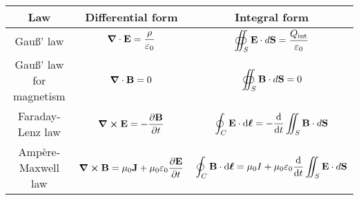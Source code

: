 \documentclass[../../../main.tex]{subfiles}
\begin{document}
\begin{table}[ht]
  \centering
  \renewcommand{\arraystretch}{2.5}
  \begin{tabular}{|c|c|c|}
    \hline
    \bfseries Law             & \bfseries Differential form                                                                                                                                & \bfseries Integral form                                                                                                                                      \\
    \hline
    Gau\ss' law               & $\displaystyle \boldsymbol{\mathrm{\grad}}\cdot\boldsymbol{\mathrm{E}}=\frac{\rho}{\varepsilon_0}$                                                                   & $\displaystyle \oiint_S\boldsymbol{\mathrm{E}}\cdot d\boldsymbol{\mathrm{S}}=\frac{Q_{\text{int}}}{\varepsilon_0}$                                                     \\
    \hline
    Gau\ss' law for magnetism & $\displaystyle \boldsymbol{\mathrm{\grad}}\cdot\boldsymbol{\mathrm{B}}=0$                                                                                            & $\displaystyle \oiint_S\boldsymbol{\mathrm{B}}\cdot d\boldsymbol{\mathrm{S}}=0$                                                                                        \\
    \hline
    Faraday-Lenz law          & $\displaystyle \vectorfunction{\grad}\crossprod\vectorfunction{E}=-\frac{\partial\vectorfunction{B}}{\partial t}$                                          & $\displaystyle \oint_C\boldsymbol{\mathrm{E}}\cdot \dd\boldsymbol{\mathrm{\ell}}=-\dv{}{t}\iint_S\boldsymbol{\mathrm{B}}\cdot d\boldsymbol{\mathrm{S}}$                          \\
    \hline
    Ampère-Maxwell law        & $\displaystyle \vectorfunction{\grad}\crossprod\vectorfunction{B}=\mu_0\vectorfunction{J}+\mu_0\varepsilon_0\frac{\partial\vectorfunction{E}}{\partial t}$ & $\displaystyle \oint_C\boldsymbol{\mathrm{B}}\cdot \dd\boldsymbol{\mathrm{\ell}}=\mu_0 I+\mu_0\varepsilon_0\dv{}{t}\iint_S\boldsymbol{\mathrm{E}}\cdot d\boldsymbol{\mathrm{S}}$ \\
    \hline
  \end{tabular}
\end{table}
\end{document}
